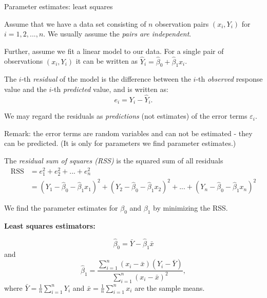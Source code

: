 \documentclass[ignorenonframetext,]{beamer}
\begin{document}
\begin{frame}

\begin{block}{Parameter estimates: least squares}

Assume that we have a data set consisting of \(n\) observation pairs
\((x_i, Y_i)\) for \(i = 1,2,..., n\). We usually assume the \emph{pairs
are independent}.

Further, assume we fit a linear model to our data. For a single pair of
observations \((x_i, Y_i)\) it can be written as
\(\hat{Y}_i = \hat{\beta}_0 + \hat{\beta}_1 x_i\).

The \(i\)-th \emph{residual} of the model is the difference between the
\(i\)-th \emph{observed} response value and the \(i\)-th
\emph{predicted} value, and is written as: \[e_i = Y_i - \hat{Y}_i.\]

We may regard the residuals as \emph{predictions} (not estimates) of the
error terms \(\varepsilon_i\).

Remark: the error terms are random variables and can not be estimated -
they can be predicted. (It is only for parameters we find parameter
estimates.)

\end{block}

\end{frame}

\begin{frame}

The \emph{residual sum of squares (RSS)} is the squared sum of all
residuals
\[\begin{aligned} \text{RSS} &= e_1^2+e_2^2+...+e_n^2 \\ &= (Y_1 - \hat{\beta}_0 - \hat{\beta}_1 x_1)^2  + (Y_2 -\hat{\beta}_0 - \hat{\beta}_1 x_2)^2+ ... + (Y_n -\hat{\beta}_0 - \hat{\beta}_1 x_n)^2  \end{aligned}\]

We find the parameter estimates for \(\beta_0\) and \(\beta_1\) by
minimizing the RSS.

\textbf{Least squares estimators:}

\[\hat{\beta}_0 = \bar{Y}-\hat{\beta}_1 \bar{x}\] and
\[\hat{\beta}_1 = \frac{\sum_{i=1}^n(x_i-\bar{x})(Y_i-\bar{Y})}{\sum_{i=1}^n(x_i-\bar{x})^2},\]
where \(\bar{Y} = \frac{1}{n} \sum_{i=1}^n Y_i\) and
\(\bar{x} = \frac{1}{n}\sum_{i=1}^n x_i\) are the sample means.

\end{frame}
\end{document}
